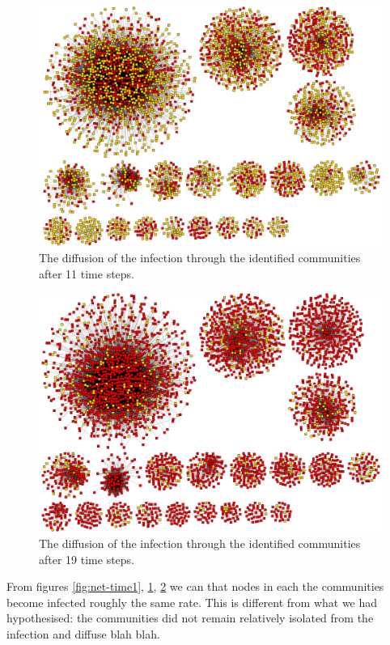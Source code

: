 \documentclass[12pt, oneside, openany]{article} %
\begin{document}
\begin{figure}
\centering
    \includegraphics[scale=0.25]{step11.png}
    \caption{The diffusion of the infection through the identified communities after 11 time steps.}
    \label{fig:net-time11}
\end{figure}

\begin{figure}
\centering
    \includegraphics[scale=0.25]{step19.png}
    \caption{The diffusion of the infection through the identified communities after 19 time steps.}
    \label{fig:net-time19}
\end{figure}

From figures \ref{fig:net-time1}, \ref{fig:net-time11}, \ref{fig:net-time19} we can that nodes in each the communities become infected roughly the same rate. This is different from what we had hypothesised: the communities did not remain relatively isolated from the infection and diffuse blah blah.
\end{document}
